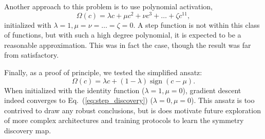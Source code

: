 \documentclass[aps,prx,reprint,preprintnumbers,superscriptaddress,nofootinbib,longbibliography,floatfix]{revtex4-1}
\DeclareRobustCommand{\Eq}[1]{Eq.~(\ref{eq:#1})}
\begin{document}
Another approach to this problem is to use polynomial activation,
%
\begin{equation}
    \Omega(c) = \lambda c + \mu c^2 + \nu c^3 + \dots + \zeta c^{11},
\end{equation}
%
initialized with $\lambda = 1, \mu = \nu = \dots = \zeta = 0$.
%
A step function is not within this class of functions, but with such a high degree polynomial, it is expected to be a reasonable approximation.
%
This was in fact the case, though the result was far from satisfactory.


Finally, as a proof of principle, we tested the simplified ansatz:
%
\begin{equation}
    \Omega(c) = \lambda c + (1-\lambda) \operatorname{sign} (c - \mu).
\end{equation}
%
When initialized with the identity function ($\lambda = 1, \mu = 0$), gradient descent indeed converges to \Eq{step_discovery} ($\lambda = 0, \mu = 0$).
%
This ansatz is too contrived to draw any robust conclusions, but is does motivate future exploration of more complex architectures and training protocols to learn the symmetry discovery map.


\end{document}
